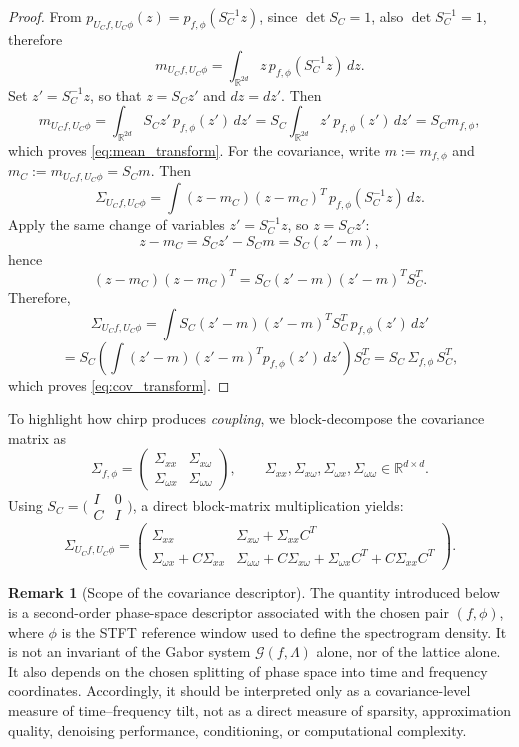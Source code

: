 \documentclass[final,1p,times,authoryear]{elsarticle}
\theoremstyle{definition}
\newtheorem{remark}[theorem]{Remark}
\newcommand{\R}{\mathbb{R}}
\newcommand{\C}{\mathbb{C}}
\newcommand{\1}{\mathbf{1}}
\begin{document}
 \begin{proof}
  From $p_{U_C f,U_C\phi}(z)=p_{f,\phi}(S_C^{-1} z)$, since $\det S_C=1$, also $\det S_C^{-1}=1$, therefore
$$
m_{U_C f,U_C\phi}
=
\int_{\R^{2d}} z\,p_{f,\phi}(S_C^{-1}z)\,dz.
$$
Set $z'=S_C^{-1}z$, so that $z=S_C z'$ and $dz=dz'$. Then
$$
m_{U_C f,U_C\phi}
=
\int_{\R^{2d}} S_C z'\,p_{f,\phi}(z')\,dz'
=
S_C\int_{\R^{2d}} z'\,p_{f,\phi}(z')\,dz'
=
S_C m_{f,\phi},
$$
which proves \eqref{eq:mean_transform}.
For the covariance, write $m:=m_{f,\phi}$ and $m_C:=m_{U_C f,U_C\phi}=S_C m$.
Then
$$
\Sigma_{U_C f,U_C\phi}
=
\int (z-m_C)(z-m_C)^T\,p_{f,\phi}(S_C^{-1}z)\,dz.
$$
Apply the same change of variables $z'=S_C^{-1}z$, so $z=S_C z'$:
$$
z-m_C=S_C z'-S_C m=S_C(z'-m),
$$
hence
$$
(z-m_C)(z-m_C)^T
=
S_C (z'-m)(z'-m)^T S_C^T.
$$
Therefore,
$$
\Sigma_{U_C f,U_C\phi}
=
\int S_C (z'-m)(z'-m)^T S_C^T\,p_{f,\phi}(z')\,dz'
$$
$$
=
S_C\left(\int (z'-m)(z'-m)^T p_{f,\phi}(z')\,dz'\right)S_C^T
=
S_C\,\Sigma_{f,\phi}\,S_C^T,
$$
which proves \eqref{eq:cov_transform}.
\end{proof}

To highlight how chirp produces \emph{coupling}, we block-decompose the covariance matrix as
$$
\Sigma_{f,\phi}=
\begin{pmatrix}
\Sigma_{xx} & \Sigma_{x\omega}\\
\Sigma_{\omega x} & \Sigma_{\omega\omega}
\end{pmatrix},
\qquad
\Sigma_{xx},\Sigma_{x\omega},\Sigma_{\omega x},\Sigma_{\omega\omega}\in\R^{d\times d}.
$$
Using $S_C=\big(\!\begin{smallmatrix}I&0\\C&I\end{smallmatrix}\!\big)$,  a direct block-matrix multiplication yields:
\begin{equation}\label{eq:block_transform}
\Sigma_{U_C f,U_C\phi}=
\begin{pmatrix}
\Sigma_{xx} &
\Sigma_{x\omega}+\Sigma_{xx}C^T\\[1mm]
\Sigma_{\omega x}+C\Sigma_{xx} &
\Sigma_{\omega\omega}
+C\Sigma_{x\omega}
+\Sigma_{\omega x}C^T
+C\Sigma_{xx}C^T
\end{pmatrix}.
\end{equation}

{\begin{remark}[Scope of the covariance descriptor]
The quantity introduced below is a second-order phase-space descriptor associated with the
chosen pair $(f,\phi)$, where $\phi$ is the STFT reference window used to define the
spectrogram density. It is not an invariant of the Gabor system
$\mathcal G(f,\Lambda)$ alone, nor of the lattice alone. It also depends on the chosen
splitting of phase space into time and frequency coordinates. Accordingly, it should be
interpreted only as a covariance-level measure of time--frequency tilt, not as a direct measure
of sparsity, approximation quality, denoising performance, conditioning, or computational
complexity.
\end{remark}}
\end{document}

